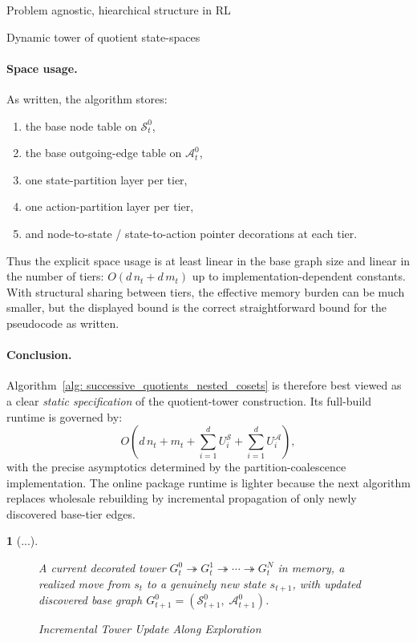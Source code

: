 \documentclass[11pt]{article}
\newtheorem{ermark}[subsubsection]{}
\begin{document}
\begin{section}{Problem agnostic, hiearchical structure in RL}
\begin{subsection}{Dynamic tower of quotient state-spaces}
\paragraph{Space usage.}
As written, the algorithm stores:
\begin{enumerate}
    \item the base node table on $\mathcal{S}_t^0$,
    \item the base outgoing-edge table on $\mathcal{A}_t^0$,
    \item one state-partition layer per tier,
    \item one action-partition layer per tier,
    \item and node-to-state / state-to-action pointer decorations at each tier.
\end{enumerate}
Thus the explicit space usage is at least linear in the base graph size and linear in the number of tiers:
$
O(d\,n_t + d\,m_t)
$
up to implementation-dependent constants. With structural sharing between tiers, the effective memory burden can be much smaller, but the displayed bound is the correct straightforward bound for the pseudocode as written.

\paragraph{Conclusion.}
Algorithm~\ref{alg: successive_quotients_nested_cosets} is therefore best viewed as a clear \emph{static specification} of the quotient-tower construction. Its full-build runtime is governed by:
\[
O\!\left(
d\,n_t + m_t + \sum_{i=1}^d U_i^{\mathcal S} + \sum_{i=1}^d U_i^{\mathcal A}
\right),
\]
with the precise asymptotics determined by the partition-coalescence implementation. The online package runtime is lighter because the next algorithm replaces wholesale rebuilding by incremental propagation of only newly discovered base-tier edges.

\begin{ermark}
[...]



\begin{figure}[!h]
\begin{algorithm}[H]
\caption{Incremental Tower Update Along Exploration}
\label{alg: incremental_tower_update}
\begin{algorithmic}[1]

\Require
A current decorated tower
$
G_t^0 \twoheadrightarrow G_t^1 \twoheadrightarrow \cdots \twoheadrightarrow G_t^N
$
in memory, a realized move from $s_t$ to a genuinely new state $s_{t+1}$, with updated discovered base graph $G_{t+1}^0=(\mathcal{S}_{t+1}^0,\;\mathcal{A}_{t+1}^0)$.


\end{algorithmic}
\end{algorithm}
\end{figure}
\end{ermark}
\end{subsection}
\end{section}
\end{document}
